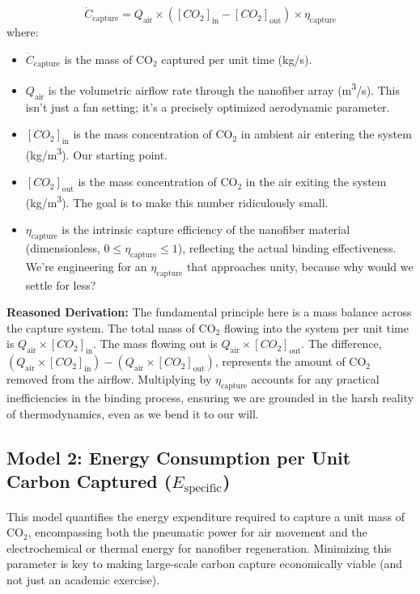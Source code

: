 \documentclass[12pt]{article}
\begin{document}
\begin{equation}
\dot{C}_{\text{capture}} = Q_{\text{air}} \times \left( [CO_2]_{\text{in}} - [CO_2]_{\text{out}} \right) \times \eta_{\text{capture}}
\label{eq:capture_rate}
\end{equation}
where:
\begin{itemize}
    \item \(\dot{C}_{\text{capture}}\) is the mass of CO\(_2\) captured per unit time (kg/s).
    \item \(Q_{\text{air}}\) is the volumetric airflow rate through the nanofiber array (m\textsuperscript{3}/s). This isn't just a fan setting; it's a precisely optimized aerodynamic parameter.
    \item \([CO_2]_{\text{in}}\) is the mass concentration of CO\(_2\) in ambient air entering the system (kg/m\textsuperscript{3}). Our starting point.
    \item \([CO_2]_{\text{out}}\) is the mass concentration of CO\(_2\) in the air exiting the system (kg/m\textsuperscript{3}). The goal is to make this number ridiculously small.
    \item \(\eta_{\text{capture}}\) is the intrinsic capture efficiency of the nanofiber material (dimensionless, \(0 \le \eta_{\text{capture}} \le 1\)), reflecting the actual binding effectiveness. We're engineering for an \(\eta_{\text{capture}}\) that approaches unity, because why would we settle for less?
\end{itemize}

\textbf{Reasoned Derivation:} The fundamental principle here is a mass balance across the capture system. The total mass of CO\(_2\) flowing into the system per unit time is \(Q_{\text{air}} \times [CO_2]_{\text{in}}\). The mass flowing out is \(Q_{\text{air}} \times [CO_2]_{\text{out}}\). The difference, \((Q_{\text{air}} \times [CO_2]_{\text{in}}) - (Q_{\text{air}} \times [CO_2]_{\text{out}})\), represents the amount of CO\(_2\) removed from the airflow. Multiplying by \(\eta_{\text{capture}}\) accounts for any practical inefficiencies in the binding process, ensuring we are grounded in the harsh reality of thermodynamics, even as we bend it to our will.

\subsection*{Model 2: Energy Consumption per Unit Carbon Captured (\(E_{\text{specific}}\))}
This model quantifies the energy expenditure required to capture a unit mass of CO\(_2\), encompassing both the pneumatic power for air movement and the electrochemical or thermal energy for nanofiber regeneration. Minimizing this parameter is key to making large-scale carbon capture economically viable (and not just an academic exercise).
\end{document}
